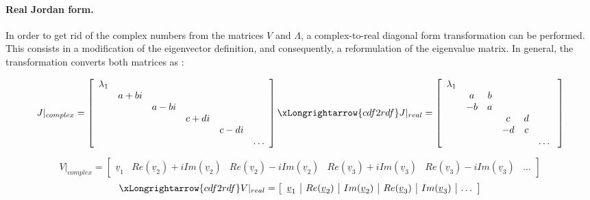			\paragraph{ Real Jordan form. \\}
			\indent In order to get rid of the complex numbers from the matrices $V$ and $\Lambda$, a complex-to-real diagonal form transformation can be performed. This consists in a modification of the eigenvector definition, and consequently, a reformulation of the eigenvalue matrix. In general, the transformation converts both matrices as \cite{cdf2rdf}:
			\begin{changemargin}{-2.6cm}{-1cm}
			\begin{equation}
			J\rvert_{complex} = \left[ \begin{array}{cccccc}
			\lambda_1 	& 			& 			& 			& 			& \\
						& a + bi 	& 			& 			& 			& \\
						&			& a - bi 	& 			& 			& \\
						&			&  			& c + di	& 			& \\
						&			&  			& 			& c - di	& \\
						&			&  			& 			&			& \ldots												
			\end{array}\right] \xLongrightarrow{cdf2rdf} J\rvert_{real} = \left[ \begin{array}{cccccc}
			\lambda_1 	& 			& 			& 			& 			& \\
						& a  		& b			& 			& 			& \\
						& -b		& a 		& 			& 			& \\
						&			&  			& c 		& d			& \\
						&			&  			& -d		& c 		& \\
						&			&  			& 			&			& \ldots\
			\end{array}\right]
			\label{eqCh2:cdf2rdf_lambda}
			\end{equation}
			\end{changemargin}
			\[
			V\rvert_{complex} = \left[ \begin{array}{c|c|c|c|c|c}
			\underline{v}_1 	& Re(\underline{v}_2) + i Im(\underline{v}_2)	& 	Re(\underline{v}_2) - i Im(\underline{v}_2)	& 	Re(\underline{v}_3) + i Im(\underline{v}_3)	& 	Re(\underline{v}_3)  - i Im(\underline{v}_3)	& \ldots											
			\end{array}\right]
			\]
			\begin{equation}
			\xLongrightarrow{cdf2rdf} V\rvert_{real} = \left[ \begin{array}{c|c|c|c|c|c}
			\underline{v}_1 	& Re(\underline{v}_2) 	& 	Im(\underline{v}_2)	& 	Re(\underline{v}_3)	& Im(\underline{v}_3)	& \ldots
			\end{array}\right]
			\label{eqCh2:cdf2rdf_V}
			\end{equation}
